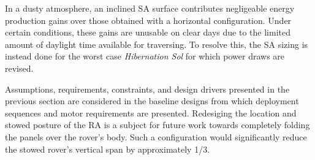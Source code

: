 In a dusty atmosphere, an inclined \ac{SA} surface contributes negligeable energy production gains over those obtained with a horizontal configuration. Under certain conditions, these gains are unusable on clear days due to the limited amount of daylight time available for traversing. To resolve this, the \ac{SA} sizing is instead done for the worst case \textit{Hibernation Sol} for which power draws are revised.

Assumptions, requirements, constraints, and design drivers presented in the previous section are considered in the baseline designs from which deployment sequences and motor requirements are presented. Redesiging the location and stowed posture of the \ac{RA} is a subject for future work towards completely folding the panels over the rover's body. Such a configuration would significantly reduce the stowed rover's vertical span by approximately 1/3.
